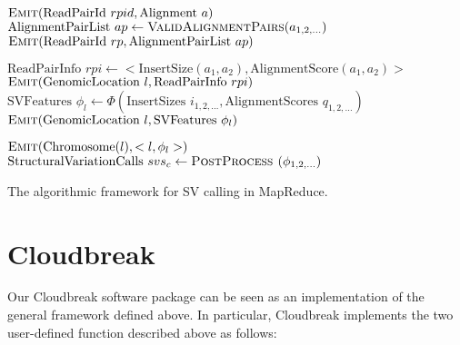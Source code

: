 \documentclass [11pt] {report}
\begin{document}


\begin{algorithm}[h]
\algrenewcommand{}
  \begin{algorithmic}[1]
    \State $\textsc{Emit}(\textrm{ReadPairId }rpid, \textrm{Alignment }a)$
    \EndFor
    \EndFunction
    \State $\textrm{AlignmentPairList }ap \gets \textsc{ValidAlignmentPairs}(a_{1,2,\ldots})$
    \State $\textsc{Emit}(\textrm{ReadPairId }rp, \textrm{AlignmentPairList } ap)$
    \EndFunction
    \EndProcedure

    \State $ \textrm{ReadPairInfo }rpi \gets <\textrm{InsertSize}(a_1,a_2), \textrm{AlignmentScore}(a_1,a_2)>$
    \State $\textsc{Emit}(\textrm{GenomicLocation }l, \textrm{ReadPairInfo }rpi)$
    \EndFor
    \EndFor
    \EndFunction
    \State $\textrm{SVFeatures } \phi_l \gets \Phi(\textrm{InsertSizes }i_{1,2,\ldots}, \textrm{AlignmentScores }q_{1,2,\ldots})$
    \State $\textsc{Emit}(\textrm{GenomicLocation }l, \textrm{SVFeatures } \phi_l)$
    \EndFunction
    \EndProcedure

    \State $\textsc{Emit}(\textrm{Chromosome}(l), <l,\phi_l>)$
    \EndFunction
    \State $\textrm{StructuralVariationCalls } svs_c \gets \textsc{PostProcess }(\phi_{1,2,\ldots})$
    \EndFunction
    \EndProcedure
  \end{algorithmic}
\caption{The algorithmic framework for SV calling in MapReduce.}
\label{cb_algo}
\end{algorithm}


% 
\chapter{Cloudbreak}
Our Cloudbreak software package can be seen as an implementation of the general framework defined above. In particular, Cloudbreak implements the two user-defined function described above as follows:
\end{document}

